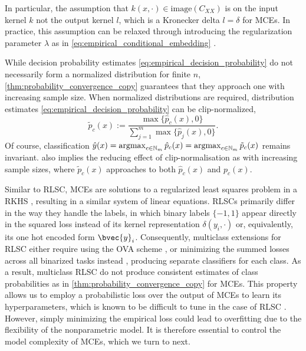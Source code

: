 \documentclass[twoside]{article}
\newcommand{\argmax}{\operatornamewithlimits{argmax}}
\begin{document}
		In particular, the assumption that $k(x, \cdot) \in \mathrm{image}(C_{XX})$ is on the input kernel $k$ not the output kernel $l$, which is a Kronecker delta $l = \delta$ for \glspl{MCE}. In practice, this assumption can be relaxed through introducing the regularization parameter $\lambda$ as in \eqref{eq:empirical_conditional_embedding} \citep{song2009hilbert}.

		While decision probability estimates \eqref{eq:empirical_decision_probability} do not necessarily form a normalized distribution for finite $n$, \cref{thm:probability_convergence_copy} guarantees that they approach one with increasing sample size. When normalized distributions are required, distribution estimates \eqref{eq:empirical_decision_probability} can be clip-normalized,
		\begin{equation}
		\tilde{p}_{c}(x) := \frac{\max\{\hat{p}_{c}(x), 0\}}{\sum_{j = 1}^{m} \max\{\hat{p}_{j}(x), 0\}}.
		\label{eq:empirical_decision_probability_clip_normalised}
		\end{equation}
		Of course, classification $\hat{y}(x) = \argmax_{c \in \mathbb{N}_{m}} \hat{p}_{c}(x) = \argmax_{c \in \mathbb{N}_{m}} \tilde{p}_{c}(x)$ remains invariant.   also implies the reducing effect of clip-normalisation as with increasing sample sizes, where $\tilde{p}_{c}(x)$ approaches to both $\hat{p}_{c}(x)$ and $p_{c}(x)$.
	
		Similar to \gls{RLSC}, \glspl{MCE} are solutions to a regularized least squares problem in a \gls{RKHS} \citep{lever2012conditional}, resulting in a similar system of linear equations. \glspl{RLSC} primarily differ in the way they handle the labels, in which binary labels $\{-1, 1\}$ appear directly in the squared loss instead of its kernel representation $\delta(y_{i}, \cdot)$ or, equivalently, its one hot encoded form $\bvec{y}_{i}$. Consequently, multiclass extensions for \gls{RLSC} either require using the \gls{OVA} scheme \citep{rifkin2003regularized}, or minimizing the summed losses across all binarized tasks instead \citep{pahikkala2012unsupervised}, producing separate classifiers for each class. As a result, multiclass \gls{RLSC} do not produce consistent estimates of class probabilities as in \cref{thm:probability_convergence_copy} for \glspl{MCE}. This property allows us to employ a probabilistic loss over the output of \glspl{MCE} to learn its hyperparameters, which is known to be difficult to tune in the case of \gls{RLSC} \citep{pahikkala2012unsupervised}. However, simply minimizing the empirical loss could lead to overfitting due to the flexibility of the nonparametric model. It is therefore essential to control the model complexity of \glspl{MCE}, which we turn to next.
				
\end{document}
